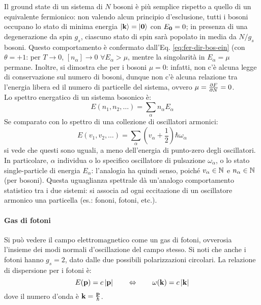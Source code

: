 Il ground state di un sistema di $ N $ bosoni è più semplice rispetto a quello di un equivalente fermionico: non valendo alcun principio d'esclusione, tutti i bosoni occupano lo stato di minima energia $ \ket{\mathbf{k}} = \ket{\mathbf{0}} $ con $ E_{\mathbf{0}} = 0 $; in presenza di una degenerazione da spin $ g_s $, ciascuno stato di spin sarà popolato in media da $ N / g_s $ bosoni. Questo comportamento è confermato dall'Eq. \ref{eq:fer-dir-bos-ein} (con $ \theta = +1 $: per $ T \rightarrow 0 $, $ [n_\alpha] \rightarrow 0 \,\,\forall E_\alpha > \mu $, mentre la singolarità in $ E_\alpha = \mu $ permane. Inoltre, si dimostra che per i bosoni $ \mu = 0 $: infatti, non c'è alcuna legge di conservazione sul numero di bosoni, dunque non c'è alcuna relazione tra l'energia libera ed il numero di particelle del sistema, ovvero $ \mu = \frac{\partial F}{\partial N} = 0 $. \\
Lo spettro energatico di un sistema bosonico è:
\begin{equation}
	E(n_1, n_2, \dots) = \sum_\alpha n_\alpha E_\alpha
\end{equation}
Se comparato con lo spettro di una collezione di oscillatori armonici:
\begin{equation*}
	E(v_1, v_2, \dots) = \sum_\alpha \left( v_\alpha + \frac{1}{2} \right) \hbar \omega_\alpha
\end{equation*}
si vede che questi sono uguali, a meno dell'energia di punto-zero degli oscillatori. In particolare, $ \alpha $ individua o lo specifico oscillatore di pulsazione $ \omega_\alpha $, o lo stato single-particle di energia $ E_\alpha $: l'analogia ha quindi senso, poiché $ v_\alpha \in \mathbb{N} $ e $ n_\alpha \in \mathbb{N} $ (per bosoni). Questa uguaglianza spettrale dà un'analogo comportamento statistico tra i due sistemi: si associa ad ogni eccitazione di un oscillatore armonico una particella (es.: fononi, fotoni, etc.).

\paragraph{Gas di fotoni}

Si può vedere il campo elettromagnetico come un gas di fotoni, ovverosia l'insieme dei modi normali d'oscillazione del campo stesso. Si noti che anche i fotoni hanno $ g_s = 2 $, dato dalle due possibili polarizzazioni circolari. La relazione di dispersione per i fotoni è:
\begin{equation}
	E(\mathbf{p}) = c \left\lvert\mathbf{p}\right\rvert
	\qquad \Leftrightarrow \qquad
	\omega(\mathbf{k}) = c \left\lvert\mathbf{k}\right\rvert
\end{equation}
dove il numero d'onda è $ \mathbf{k} = \frac{\mathbf{p}}{\hbar} $.

